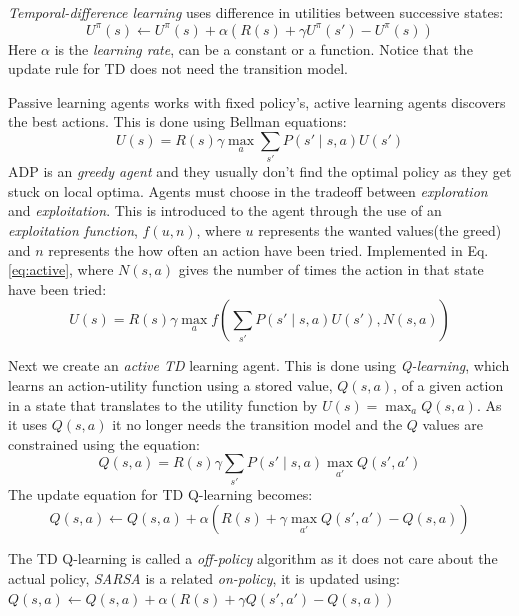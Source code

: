 \documentclass[11pt, letterpaper]{report}
\numberwithin{equation}{section}
\begin{document}
\emph{Temporal-difference learning} uses difference in utilities between
successive states:
\begin{equation}
  \label{eq:temporaldiff}
  U^\pi(s) \leftarrow U^\pi(s) + \alpha (R(s) + \gamma U^\pi(s') - U^\pi(s))
\end{equation}
Here $\alpha$ is the \emph{learning rate}, can be a constant or a function.
Notice that the update rule for TD does not need the transition model.

Passive learning agents works with fixed policy's, active learning agents
discovers the best actions. This is done using Bellman equations:
\begin{equation}
  \label{eq:active}
  U(s) = R(s) \gamma \max_a \sum_{s'} P(s' \mid s,a )U(s')
\end{equation}
ADP is an \emph{greedy agent} and they usually don't find the optimal policy as
they get stuck on local optima. Agents must choose in the tradeoff between
\emph{exploration} and \emph{exploitation}. This is introduced to the agent
through the use of an \emph{exploitation function}, $f(u,n)$, where $u$
represents the wanted values(the greed) and $n$ represents the how often an
action have been tried. Implemented in Eq. \ref{eq:active}, where $N(s,a)$ gives
the number of times the action in that state have been tried:
\begin{equation}
  \label{eq:activeexplore}
  U(s) = R(s) \gamma \max_a f(\sum_{s'} P(s' \mid s,a )U(s'), N(s,a))
\end{equation}

Next we create an \emph{active TD} learning agent. This is done using
\emph{Q-learning}, which learns an action-utility function using a stored value,
$Q(s,a)$, of a given action in a state that translates to the utility function
by $U(s) = \max_a Q(s,a)$. As it uses $Q(s,a)$ it no longer needs the transition
model and the $Q$ values are constrained using the equation:
\begin{equation}
  \label{eq:qconstraint}
  Q(s,a) = R(s) \gamma \sum_{s'} P(s' \mid s,a ) \max_{a'} Q(s',a')
\end{equation}
The update equation for TD Q-learning becomes:
\begin{equation}
  \label{eq:qupdate}
  Q(s,a) \leftarrow Q(s,a) + \alpha (R(s) + \gamma \max_{a'} Q(s',a') - Q(s,a))
\end{equation}

The TD Q-learning is called a \emph{off-policy} algorithm as it does not care
about the actual policy, \emph{SARSA} is a related \emph{on-policy}, it is
updated using: $Q(s,a) \leftarrow Q(s,a) + \alpha (R(s) + \gamma Q(s',a') - Q(s,a))$
\end{document}
